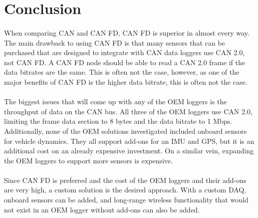 \section{Conclusion}

\paragraph{}
When comparing CAN and CAN FD, CAN FD is superior in almost every way.
The main drawback to using CAN FD is that many sensors that can be purchased that are designed to integrate with CAN data loggers use CAN 2.0, not CAN FD.
A CAN FD node should be able to read a CAN 2.0 frame if the data bitrates are the same.
This is often not the case, however, as one of the major benefits of CAN FD is the higher data bitrate, this is often not the case.

\paragraph{}
The biggest issues that will come up with any of the OEM loggers is the throughput of data on the CAN bus.
All three of the OEM loggers use CAN 2.0, limiting the frame data section to 8 bytes and the data bitrate to 1 Mbps.
Additionally, none of the OEM solutions investigated included onboard sensors for vehicle dynamics.
They all support add-ons for an IMU and GPS, but it is an additional cost on an already expensive investment.
On a similar vein, expanding the OEM loggers to support more sensors is expensive.

\paragraph{}
Since CAN FD is preferred and the cost of the OEM loggers and their add-ons are very high, a custom solution is the desired approach.
With a custom DAQ, onboard sensors can be added, and long-range wireless functionality that would not exist in an OEM logger without add-ons can also be added.
